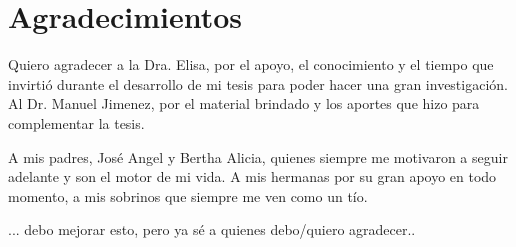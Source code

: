 
\chapter{Agradecimientos}

Quiero agradecer a la Dra. Elisa, por el apoyo, el conocimiento y el tiempo que invirtió durante el desarrollo de mi tesis para poder hacer una gran investigación. Al Dr. Manuel Jimenez, por el material brindado y los aportes que hizo para complementar la tesis. 

A mis padres, José Angel y Bertha Alicia, quienes siempre me motivaron a seguir adelante y son el motor de mi vida. A mis hermanas por su gran apoyo en todo momento, a mis sobrinos que siempre me ven como un tío.

... debo mejorar esto, pero ya sé a quienes debo/quiero agradecer..